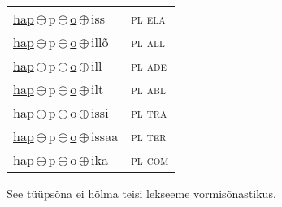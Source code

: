 \begin{minipage}{\textwidth}
\begin{sideways}
\begin{tabular}{l l}
\underline{hap}\,$\oplus$\,p\,$\oplus$\,\underline{o}\,$\oplus$\,iss & \textsc{ pl ela } \\
\underline{hap}\,$\oplus$\,p\,$\oplus$\,\underline{o}\,$\oplus$\,illõ & \textsc{ pl all } \\
\underline{hap}\,$\oplus$\,p\,$\oplus$\,\underline{o}\,$\oplus$\,ill & \textsc{ pl ade } \\
\underline{hap}\,$\oplus$\,p\,$\oplus$\,\underline{o}\,$\oplus$\,ilt & \textsc{ pl abl } \\
\underline{hap}\,$\oplus$\,p\,$\oplus$\,\underline{o}\,$\oplus$\,issi & \textsc{ pl tra } \\
\underline{hap}\,$\oplus$\,p\,$\oplus$\,\underline{o}\,$\oplus$\,issaa & \textsc{ pl ter } \\
\underline{hap}\,$\oplus$\,p\,$\oplus$\,\underline{o}\,$\oplus$\,ika & \textsc{ pl com } \\
\end{tabular}
\end{sideways}
\label{tab:tüüpsõnamall-hapo}

\end{minipage}

 
\vspace{1em}
\noindent See tüüpsõna ei hõlma teisi lekseeme vormi\-sõnastikus.
